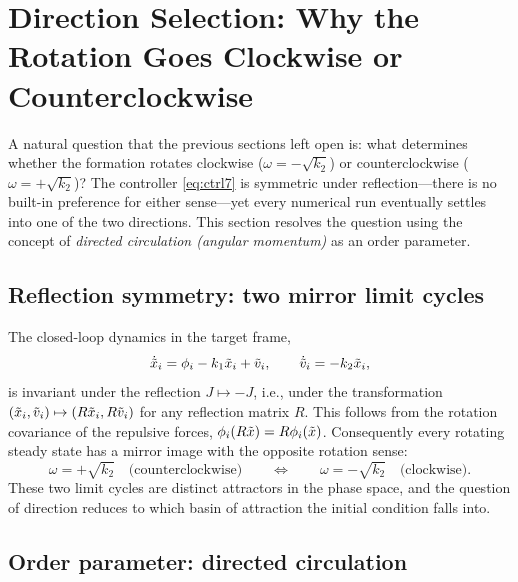 \section{Direction Selection: Why the Rotation Goes Clockwise or Counterclockwise}
\label{sec:direction}

A natural question that the previous sections left open is: what determines whether the formation
rotates clockwise ($\omega=-\sqrt{k_2}$) or counterclockwise ($\omega=+\sqrt{k_2}$)? The controller
\eqref{eq:ctrl7} is symmetric under reflection---there is no built-in preference for either
sense---yet every numerical run eventually settles into one of the two directions. This section
resolves the question using the concept of \emph{directed circulation (angular momentum)} as an
order parameter.

\subsection{Reflection symmetry: two mirror limit cycles}

The closed-loop dynamics in the target frame,
\begin{equation}
  \dot{\tilde{x}}_i=\phi_i-k_1\tilde{x}_i+\tilde{v}_i,\qquad
  \dot{\tilde{v}}_i=-k_2\tilde{x}_i,
  \label{eq:dirn_dyn}
\end{equation}
is invariant under the reflection $J\mapsto-J$, i.e., under the transformation
$(\tilde{x}_i,\tilde{v}_i)\mapsto(R\tilde{x}_i,R\tilde{v}_i)$ for any reflection matrix $R$. This follows from the
rotation covariance of the repulsive forces, $\phi_i(R\tilde{x})=R\phi_i(\tilde{x})$. Consequently every
rotating steady state has a mirror image with the opposite rotation sense:
\begin{equation}
  \omega=+\sqrt{k_2}\quad\text{(counterclockwise)}\qquad\Longleftrightarrow\qquad
  \omega=-\sqrt{k_2}\quad\text{(clockwise)}.
  \label{eq:mirror}
\end{equation}
These two limit cycles are distinct attractors in the phase space, and the question of direction
reduces to which basin of attraction the initial condition falls into.

\subsection{Order parameter: directed circulation}
\label{sec:orderparam}

